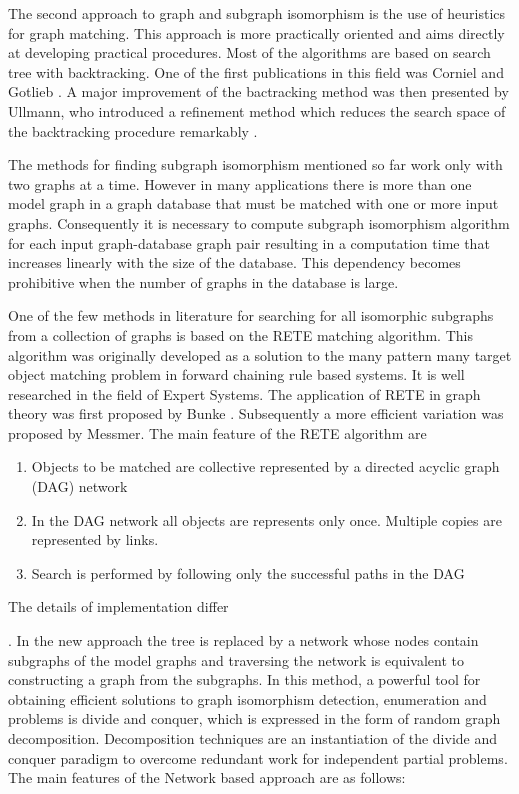 The second approach to graph and subgraph isomorphism is the use of heuristics for graph matching. This approach is more practically oriented and aims 
directly at developing practical procedures. Most of the algorithms are based on search tree with backtracking. One of the first publications in this 
field was Corniel and Gotlieb \cite{corneil1970}. A major improvement of the bactracking method was then presented by Ullmann, who introduced  a refinement 
method which reduces the search space of the backtracking procedure remarkably \cite{ullmann1976}.

The methods for finding subgraph isomorphism mentioned so far work only with two graphs at a time. However in many applications there is more than 
one model graph in a graph database that must be matched with one or more input graphs. Consequently it is necessary to compute subgraph isomorphism algorithm for each input graph-database graph pair resulting in a computation time that increases linearly with the size of the database. This dependency becomes prohibitive when the number of graphs in the database is large.  

One of the few methods in literature for searching for all isomorphic subgraphs from a collection of graphs is based on the RETE matching algorithm. This algorithm was originally developed as a solution to the many pattern many target object matching problem in forward chaining rule based systems. It is well researched in the field of Expert Systems. The application of RETE in graph theory was first proposed by Bunke \cite{bunke_glauser_tran1991}. Subsequently a more efficient variation was proposed by Messmer\cite{messmer_bunke2000}. The main feature of the RETE algorithm are 

\begin{enumerate}
\item Objects to be matched are collective represented by a directed acyclic graph (DAG) network
\item In the DAG network  all objects are represents only once. Multiple copies are represented by links.
\item Search is performed by following only the successful paths in the DAG 
\end{enumerate}
 
The details of implementation differ 

\cite{messmer_bunke2000} . In the new approach the tree is replaced by a network whose nodes contain subgraphs of the model graphs and traversing the 
network is equivalent to constructing a graph from the subgraphs. In this method, a powerful tool for obtaining efficient solutions to graph isomorphism 
detection, enumeration  and  problems is divide and conquer, which is expressed in the form of random graph decomposition. Decomposition techniques are 
an instantiation of the divide and conquer paradigm to overcome redundant work for independent partial problems. The main features of the Network based 
approach are as follows:

